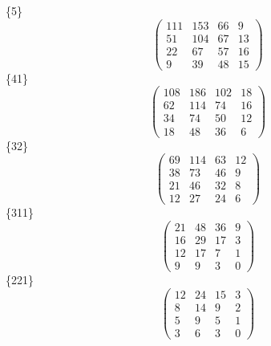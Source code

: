 \documentclass[12pt,reqno]{amsart}
\begin{document}
\Large
\{5\}                             $$ \begin{pmatrix} 
                        111 & 153 & 66 & 9 \\[6pt]
                        51 & 104 & 67 & 13 \\[6pt]
                         22 & 67 & 57 & 16 \\[6pt]
                           9 & 39 & 48 & 15
                              \end{pmatrix} $$ 
\{41\}                             $$ \begin{pmatrix} 
                       108 & 186 & 102 & 18 \\[6pt]
                        62 & 114 & 74 & 16 \\[6pt]
                         34 & 74 & 50 & 12 \\[6pt]
                           18 & 48 & 36 & 6
                              \end{pmatrix} $$ 
\{32\}                             $$ \begin{pmatrix} 
                        69 & 114 & 63 & 12 \\[6pt]
                         38 & 73 & 46 & 9 \\[6pt]
                         21 & 46 & 32 & 8 \\[6pt]
                           12 & 27 & 24 & 6
                              \end{pmatrix} $$ 
\{311\}                             $$ \begin{pmatrix} 
                         21 & 48 & 36 & 9 \\[6pt]
                         16 & 29 & 17 & 3 \\[6pt]
                          12 & 17 & 7 & 1 \\[6pt]
                             9 & 9 & 3 & 0
                              \end{pmatrix} $$ 
\{221\}                             $$ \begin{pmatrix} 
                         12 & 24 & 15 & 3 \\[6pt]
                          8 & 14 & 9 & 2 \\[6pt]
                           5 & 9 & 5 & 1 \\[6pt]
                             3 & 6 & 3 & 0
                              \end{pmatrix} $$ 
\end{document}
